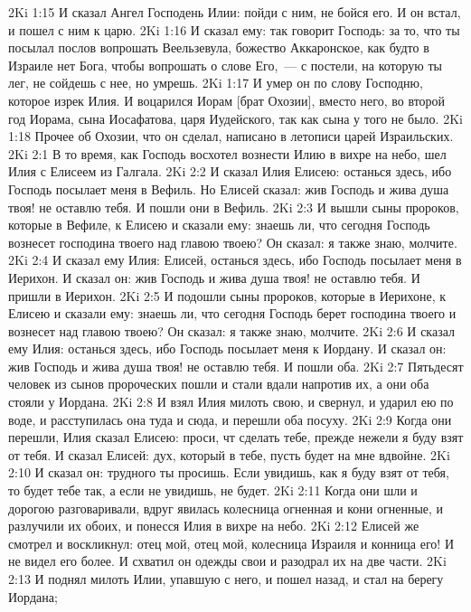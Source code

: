 \vs 2Ki 1:15 И сказал Ангел Господень Илии: пойди с ним, не бойся его. И он встал, и пошел с ним к царю.
\vs 2Ki 1:16 И сказал ему: так говорит Господь: за то, что ты посылал послов вопрошать Веельзевула, божество Аккаронское, как будто в Израиле нет Бога, чтобы вопрошать о слове Его,~--- с постели, на которую ты лег, не сойдешь с нее, но умрешь.
\vs 2Ki 1:17 И умер он по слову Господню, которое изрек Илия. И воцарился Иорам [брат Охозии], вместо него, во второй год Иорама, сына Иосафатова, царя Иудейского, так как сына у того не было.
\rsbpar\vs 2Ki 1:18 Прочее об Охозии, что он сделал, написано в летописи царей Израильских.
\vs 2Ki 2:1 В то время, как Господь восхотел вознести Илию в вихре на небо, шел Илия с Елисеем из Галгала.
\vs 2Ki 2:2 И сказал Илия Елисею: останься здесь, ибо Господь посылает меня в Вефиль. Но Елисей сказал: жив Господь и жива душа твоя! не оставлю тебя. И пошли они в Вефиль.
\vs 2Ki 2:3 И вышли сыны пророков, которые в Вефиле, к Елисею и сказали ему: знаешь ли, что сегодня Господь вознесет господина твоего над главою твоею? Он сказал: я также знаю, молчите.
\vs 2Ki 2:4 И сказал ему Илия: Елисей, останься здесь, ибо Господь посылает меня в Иерихон. И сказал он: жив Господь и жива душа твоя! не оставлю тебя. И пришли в Иерихон.
\vs 2Ki 2:5 И подошли сыны пророков, которые в Иерихоне, к Елисею и сказали ему: знаешь ли, что сегодня Господь берет господина твоего и вознесет над главою твоею? Он сказал: я также знаю, молчите.
\vs 2Ki 2:6 И сказал ему Илия: останься здесь, ибо Господь посылает меня к Иордану. И сказал он: жив Господь и жива душа твоя! не оставлю тебя. И пошли оба.
\vs 2Ki 2:7 Пятьдесят человек из сынов пророческих пошли и стали вдали напротив их, а они оба стояли у Иордана.
\vs 2Ki 2:8 И взял Илия милоть свою, и свернул, и ударил ею по воде, и расступилась она туда и сюда, и перешли оба посуху.
\vs 2Ki 2:9 Когда они перешли, Илия сказал Елисею: проси, чт сделать тебе, прежде нежели я буду взят от тебя. И сказал Елисей: дух, который в тебе, пусть будет на мне вдвойне.
\vs 2Ki 2:10 И сказал он: трудного ты просишь. Если увидишь, как я буду взят от тебя, то будет тебе так, а если не увидишь, не будет.
\rsbpar\vs 2Ki 2:11 Когда они шли и дорогою разговаривали, вдруг явилась колесница огненная и кони огненные, и разлучили их обоих, и понесся Илия в вихре на небо.
\vs 2Ki 2:12 Елисей же смотрел и воскликнул: отец мой, отец мой, колесница Израиля и конница его! И не видел его более. И схватил он одежды свои и разодрал их на две части.
\vs 2Ki 2:13 И поднял милоть Илии, упавшую с него, и пошел назад, и стал на берегу Иордана;
